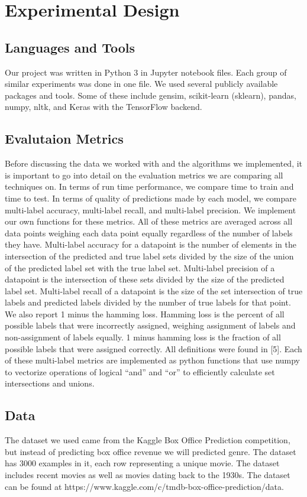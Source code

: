 \documentclass[sigconf]{acmart}
\begin{document}
\section{Experimental Design}
\subsection{Languages and Tools}
Our project was written in Python 3 in Jupyter notebook files.  Each group of similar experiments was done in one file.  We used several publicly available packages and tools.  Some of these include gensim, scikit-learn (sklearn), pandas, numpy, nltk, and Keras with the TensorFlow backend. 

\subsection{Evalutaion Metrics}
Before discussing the data we worked with and the algorithms we implemented, it is important to go into detail on the evaluation metrics we are comparing all techniques on.  In terms of run time performance, we compare time to train and time to test. In terms of quality of predictions made by each model, we compare multi-label accuracy, multi-label recall, and multi-label precision.  We implement our own functions for these metrics. All of these metrics are averaged across all data points weighing each data point equally regardless of the number of labels they have. Multi-label accuracy for a datapoint is the number of elements in the intersection of the predicted and true label sets divided by the size of the union of the predicted label set with the true label set. Multi-label precision of a datapoint is the intersection of these sets divided by the size of the predicted label set.  Multi-label recall of a datapoint is the size of the set intersection of true labels and predicted labels divided by the number of true labels for that point. We also report 1 minus the hamming loss.  Hamming loss is the percent of all possible labels that were incorrectly assigned, weighing assignment of labels and non-assignment of labels equally. 1 minus hamming loss is the fraction of all possible labels that were assigned correctly. All definitions were found in [5]. Each of these multi-label metrics are implemented as python functions that use numpy to vectorize operations of logical ``and'' and ``or'' to efficiently calculate set intersections and unions. 

\subsection{Data}
The dataset we used came from the Kaggle Box Office Prediction competition, but instead of predicting box office revenue we will predicted genre.  The dataset has 3000 examples in it, each row representing a unique movie.  The dataset includes recent movies as well as movies dating back to the 1930s. The dataset can be found at https://www.kaggle.com/c/tmdb-box-office-prediction/data.
\end{document}
